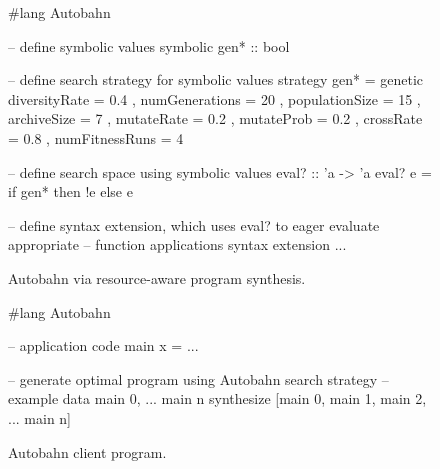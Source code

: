 \begin{figure}[t]
        
\centering
\begin{mylisting}
#lang Autobahn

-- define symbolic values
symbolic gen* :: bool

-- define search strategy for symbolic values
strategy gen* = 
  genetic { diversityRate = 0.4
            , numGenerations = 20
            , populationSize = 15
            , archiveSize = 7
            , mutateRate = 0.2
            , mutateProb = 0.2
            , crossRate = 0.8
            , numFitnessRuns = 4 }

-- define search space using symbolic values
eval? :: 'a -> 'a
eval? e =
  if gen* then
    !e
  else
    e

-- define syntax extension, which uses eval? to eager evaluate appropriate
-- function applications
syntax extension ...
\end{mylisting}
\caption{Autobahn via resource-aware program synthesis.  
}
\label{fig:autobahn-via-synthesis}
\end{figure}

\begin{figure}[t]
        
\centering
\begin{mylisting}
#lang Autobahn

-- application code
main x = ...

-- generate optimal program using Autobahn search strategy
-- example data main 0, ... main n
synthesize [main 0, main 1, main 2, ... main n]
\end{mylisting}
\caption{Autobahn client program.}
\label{fig:autobahn-client}
\end{figure}

